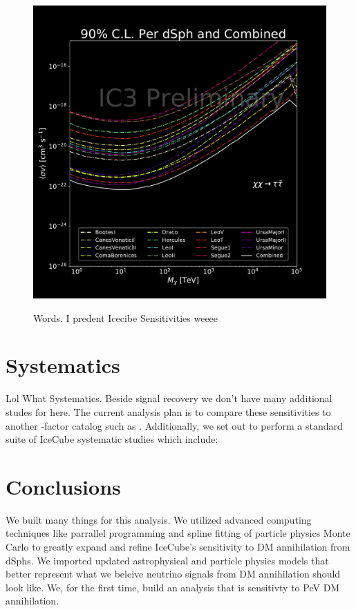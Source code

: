 \begin{figure}[t]
{        \includegraphics[scale=0.275]{figures/ic_DM/dm_plots/tautau_money_plot_comb.pdf}
    }
    \caption{Words. I predent Icecibe Sensitivities weeee}
    \label{fig:icDM_sensitivity_2of2}
\end{figure}

\section{Systematics} \label{sec:icDM_Systematics}

Lol What Systematics.
Beside signal recovery we don't have many additional studes for here.
The current analysis plan is to compare these sensitivities to another \J-factor catalog such as \LS \cite{DM_Strigari20}.
Additionally, we set out to perform a standard suite of IceCube systematic studies which include: 

\section{Conclusions} \label{sec:icDM_conclude}

We built many things for this analysis.
We utilized advanced computing techniques like parrallel programming and spline fitting of particle physics Monte Carlo to greatly expand and refine IceCube's sensitivity to DM annihilation from dSphs.
We imported updated astrophysical and particle physics models that better represent what we beleive neutrino signals from DM annihilation should look like.
We, for the first time, build an analysis that is sensitivty to PeV DM annihilation.

